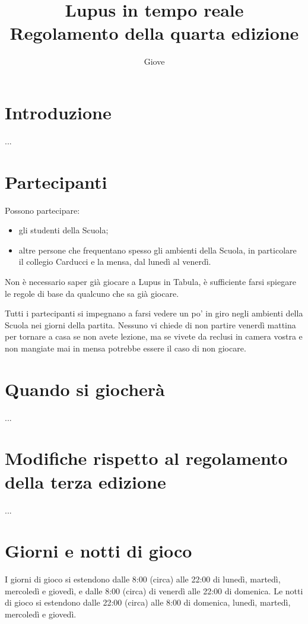 \documentclass[a4paper,10pt]{article}
\title{Lupus in tempo reale\\ Regolamento della quarta edizione}
\author{Giove}
\begin{document}
\maketitle


\section{Introduzione}

...

\section{Partecipanti}

Possono partecipare:
\begin{itemize}
 \item gli studenti della Scuola;
 \item altre persone che frequentano spesso gli ambienti della Scuola, in particolare il collegio Carducci e la mensa, dal lunedì al venerdì.
\end{itemize}

Non è necessario saper già giocare a Lupus in Tabula, è sufficiente farsi spiegare le regole di base da qualcuno che sa già giocare.

Tutti i partecipanti si impegnano a farsi vedere un po' in giro negli ambienti della Scuola nei giorni della partita. Nessuno vi chiede di non partire venerdì mattina per tornare a casa se non avete lezione, ma se vivete da reclusi in camera vostra e non mangiate mai in mensa potrebbe essere il caso di non giocare.


\section{Quando si giocherà}

...


\section{Modifiche rispetto al regolamento della terza edizione}

...


\section{Giorni e notti di gioco}

I giorni di gioco si estendono dalle 8:00 (circa) alle 22:00 di lunedì, martedì, mercoledì e giovedì, e dalle 8:00 (circa) di venerdì alle 22:00 di domenica.
Le notti di gioco si estendono dalle 22:00 (circa) alle 8:00 di domenica, lunedì, martedì, mercoledì e giovedì.
\end{document}

